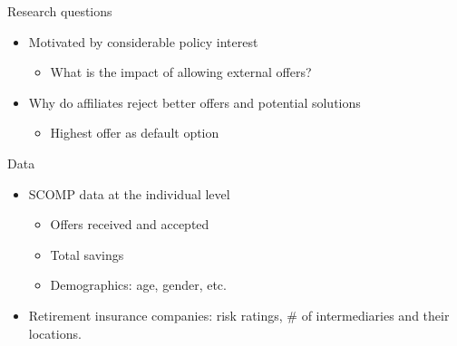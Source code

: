 \documentclass[10pt,aspectratio=169]{beamer}
\begin{document}
\begin{frame}{Research questions}
\begin{itemize}
    \item Motivated by considerable policy interest
    \begin{itemize}
        \item What is the impact of allowing external offers? %
    \end{itemize}
    \item Why do affiliates reject better offers and potential solutions
        \begin{itemize}
            \item Highest offer as default option
        \end{itemize}
\end{itemize}
\end{frame}


 \begin{frame}{Data}
\begin{itemize}
    \item SCOMP data at the individual level  
    \begin{itemize}
        \item Offers received and accepted 
        \item Total savings 
        \item Demographics: age, gender, etc. 
    \end{itemize}
     \item Retirement insurance companies: risk ratings, \#  of intermediaries and their  locations.
\end{itemize}
\end{frame}
 
\end{document}
